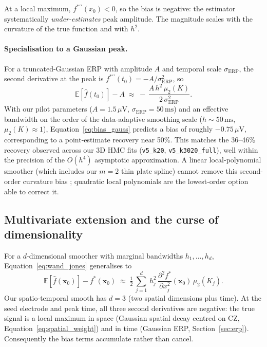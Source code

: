 \documentclass[12pt, a4paper]{article}
\begin{document}
At a local maximum, $f^{*\prime\prime}(x_0) < 0$, so the bias is negative:
the estimator systematically \emph{under-estimates} peak amplitude. The
magnitude scales with the curvature of the true function and with $h^{2}$.

\paragraph{Specialisation to a Gaussian peak.}
For a truncated-Gaussian ERP with amplitude $A$ and temporal scale
$\sigma_{\mathrm{ERP}}$, the second derivative at the peak is
$f^{*\prime\prime}(t_0) = -A/\sigma_{\mathrm{ERP}}^{2}$, so
\begin{equation}\label{eq:bias_gauss}
\mathbb{E}[\hat{f}(t_0)] - A
   \;\approx\; -\, \frac{A\, h^{2}\, \mu_{2}(K)}{2\,\sigma_{\mathrm{ERP}}^{2}}.
\end{equation}
With our pilot parameters ($A = 1.5\,\mu\mathrm{V}$,
$\sigma_{\mathrm{ERP}} = 50\,\mathrm{ms}$) and an effective bandwidth on
the order of the data-adaptive smoothing scale
($h \sim 50\,\mathrm{ms}$, $\mu_{2}(K)\approx 1$),
Equation~\eqref{eq:bias_gauss} predicts a bias of roughly $-0.75\,\mu\mathrm{V}$,
corresponding to a point-estimate recovery near 50\%. This matches the
36--46\% recovery observed across our 3D HMC fits
(\texttt{v5\_k20}, \texttt{v5\_k3020\_full}), well within the precision of the
$O(h^{4})$ asymptotic approximation. A linear local-polynomial smoother (which
includes our $m=2$ thin plate spline) cannot remove this second-order curvature
bias \citep[\S 3.1]{FanGijbels1996}; quadratic local polynomials are the
lowest-order option able to correct it.

\subsection{Multivariate extension and the curse of dimensionality}\label{sec:bias_mvt}

For a $d$-dimensional smoother with marginal bandwidths $h_{1},\dots,h_{d}$,
Equation~\eqref{eq:wand_jones} generalises to
\begin{equation}\label{eq:bias_mvt}
\mathbb{E}[\hat{f}(\mathbf{x}_0)] - f^{*}(\mathbf{x}_0)
   \;\approx\; \tfrac{1}{2}\,\sum_{j=1}^{d}\, h_{j}^{2}\,
   \frac{\partial^{2} f^{*}}{\partial x_{j}^{2}}(\mathbf{x}_0)\, \mu_{2}(K_{j}).
\end{equation}
Our spatio-temporal smooth has $d = 3$ (two spatial dimensions plus time).
At the seed electrode and peak time, all three second derivatives are
negative: the true signal is a local maximum in space (Gaussian spatial decay
centred on CZ, Equation~\eqref{eq:spatial_weight}) and in time (Gaussian ERP,
Section~\ref{sec:erp}). Consequently the bias terms accumulate rather than
cancel.
\end{document}

